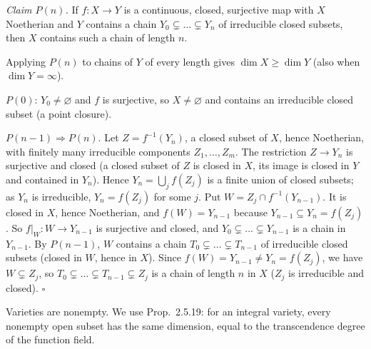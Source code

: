 \documentclass[11pt]{article}
\begin{document}
\emph{Claim $P(n)$.} If $f:X\to Y$ is a continuous, closed, surjective map with $X$ Noetherian and $Y$ contains a chain $Y_0\subsetneq\dots\subsetneq Y_n$ of irreducible closed subsets, then $X$ contains such a chain of length $n$.

Applying $P(n)$ to chains of $Y$ of every length gives $\dim X\ge\dim Y$ (also when $\dim Y=\infty$).

$P(0)$: $Y_0\ne\varnothing$ and $f$ is surjective, so $X\neq\varnothing$ and contains an irreducible closed subset (a point closure).

$P(n-1)\Rightarrow P(n)$. Let $Z=f^{-1}(Y_n)$, a closed subset of $X$, hence Noetherian, with finitely many irreducible components $Z_1,\dots,Z_m$. The restriction $Z\to Y_n$ is surjective and closed (a closed subset of $Z$ is closed in $X$, its image is closed in $Y$ and contained in $Y_n$). Hence $Y_n=\bigcup_jf(Z_j)$ is a finite union of closed subsets; as $Y_n$ is irreducible, $Y_n=f(Z_j)$ for some $j$. Put $W=Z_j\cap f^{-1}(Y_{n-1})$. It is closed in $X$, hence Noetherian, and $f(W)=Y_{n-1}$ because $Y_{n-1}\subseteq Y_n=f(Z_j)$. So $f|_W:W\to Y_{n-1}$ is surjective and closed, and $Y_0\subsetneq\dots\subsetneq Y_{n-1}$ is a chain in $Y_{n-1}$. By $P(n-1)$, $W$ contains a chain $T_0\subsetneq\dots\subsetneq T_{n-1}$ of irreducible closed subsets (closed in $W$, hence in $X$). Since $f(W)=Y_{n-1}\ne Y_n=f(Z_j)$, we have $W\subsetneq Z_j$, so $T_0\subsetneq\dots\subsetneq T_{n-1}\subsetneq Z_j$ is a chain of length $n$ in $X$ ($Z_j$ is irreducible and closed). \hfill$\square$

\pf
Varieties are nonempty. We use Prop.~2.5.19: for an integral variety, every nonempty open subset has the same dimension, equal to the transcendence degree of the function field.
\end{document}
